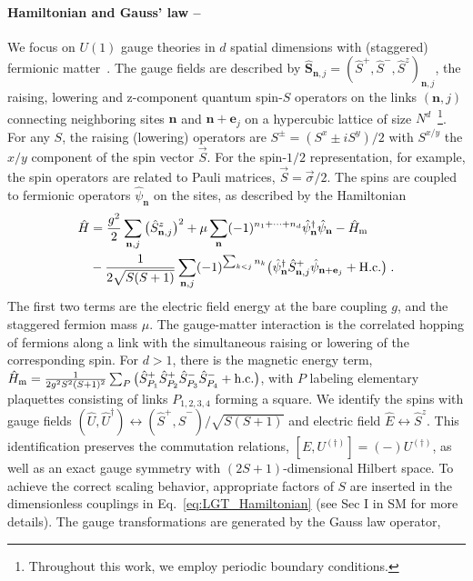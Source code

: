 \documentclass[aps,prl,reprint,twocolumn,superscriptaddress,floatfix,nofootinbib]{revtex4-1}
\begin{document}
	\paragraph{Hamiltonian and Gauss' law --}
	We focus on $U(1)$ gauge theories in $d$ spatial dimensions with (staggered) fermionic matter~\cite{kogut1975hamiltonian}. The gauge fields are described by $\hat{\mathbf{S}}_{\mathbf{n},j}= (\hat{S}^+,\hat{S}^-,\hat{S}^z)_{\mathbf{n},j}$, the raising, lowering and z-component quantum spin-$S$ operators on the links $(\mathbf{n},j)$ connecting neighboring sites $\mathbf{n}$ and $\mathbf{n} + \mathbf{e}_j$ on a hypercubic lattice of size $N^d$~\footnote{Throughout this work, we employ periodic boundary conditions.}. For any $S$, the raising (lowering) operators are $S^\pm = (S^x \pm i S^y)/2$ with $S^{x/y}$ the $x/y$ component of the spin vector $\vec{S}$. For the spin-$1/2$ representation, for example, the spin operators are related to Pauli matrices, $\vec{S} = \vec{\sigma}/2$. The spins are coupled to fermionic operators $\hat{\psi}_{\mathbf{n}}$ on the sites, as described by the Hamiltonian
	\begin{align}\label{eq:LGT_Hamiltonian}
		\hat{H} &= \frac{g^2}{2} \sum_{\mathbf{n},j} \big(\hat{S}^z_{\mathbf{n},j}\big)^2 + \mu \sum_{\mathbf{n}} (-1)^{n_1 + \dots + n_d} \hat{\psi}_\mathbf{n}^\dagger\hat{\psi}_\mathbf{n} - \hat{H}_{\rm m} \nonumber \\
		&- \frac{1}{2\sqrt{S (S + 1)}}  \sum_{\mathbf{n},j} (-1)^{\sum_{k<j} n_k} \big( \hat{\psi}_\mathbf{n}^\dagger \hat{S}^+_{\mathbf{n},j}\hat{\psi}_{\mathbf{n}+\mathbf{e}_j} + \text{H.c.}\big) \;. 
	\end{align}
	The first two terms are the electric field energy at the bare coupling $g$, and the staggered fermion mass $\mu$.
	The gauge-matter interaction is the correlated hopping of fermions along a link with the simultaneous raising or lowering of the corresponding spin. For $d > 1$, there is the magnetic energy term, $\hat{H}_{\rm m} =\frac{1}{2g^2 S^2 (S + 1)^2} \sum_{P}\big(\hat{S}^+_{P_1} \hat{S}^+_{P_2}\hat{S}^-_{P_3} \hat{S}^-_{P_4}+ \text{h.c.}\big)$, with $P$ labeling elementary plaquettes consisting of links $P_{1,2,3,4}$ forming a square. 
	We identify the spins with gauge fields $(\hat{U}, \hat{U}^\dagger) \leftrightarrow (\hat{S}^+, \hat{S}^-)/\sqrt{S(S+1)}$ and electric field $\hat{E} \leftrightarrow \hat{S}^z$.
	This identification preserves the commutation relations, $[E,U^{(\dagger)}] =(-) U^{(\dagger)}$, 
	as well as an exact gauge symmetry with $(2S+1)$-dimensional Hilbert space. To achieve the correct scaling behavior, appropriate factors of $S$ are inserted in the dimensionless couplings in  Eq.~\eqref{eq:LGT_Hamiltonian} (see Sec I in SM for more details). The gauge transformations are generated by the Gauss law operator,
\end{document}
